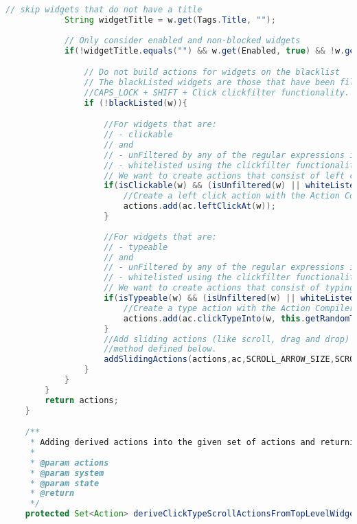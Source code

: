 \begin{lstlisting}[language=java, basicstyle=\tiny, caption=Protocol for the real world application, label=code:real-world-app-protocol]
            // skip widgets that do not have a title
			String widgetTitle = w.get(Tags.Title, "");
          
            // Only consider enabled and non-blocked widgets
            if(!widgetTitle.equals("") && w.get(Enabled, true) && !w.get(Blocked, false)){

                // Do not build actions for widgets on the blacklist
                // The blackListed widgets are those that have been filtered during the SPY mode with the
                //CAPS_LOCK + SHIFT + Click clickfilter functionality.
                if (!blackListed(w)){

                    //For widgets that are:
                    // - clickable
                    // and
                    // - unFiltered by any of the regular expressions in the Filter-tab, or
                    // - whitelisted using the clickfilter functionality in SPY mode (CAPS_LOCK + SHIFT + CNTR + Click)
                    // We want to create actions that consist of left clicking on them
                    if(isClickable(w) && (isUnfiltered(w) || whiteListed(w))) {
                        //Create a left click action with the Action Compiler, and add it to the set of derived actions
                        actions.add(ac.leftClickAt(w));
                    }
                   
                    //For widgets that are:
                    // - typeable
                    // and
                    // - unFiltered by any of the regular expressions in the Filter-tab, or
                    // - whitelisted using the clickfilter functionality in SPY mode (CAPS_LOCK + SHIFT + CNTR + Click)
                    // We want to create actions that consist of typing into them
                    if(isTypeable(w) && (isUnfiltered(w) || whiteListed(w))) {
                        //Create a type action with the Action Compiler, and add it to the set of derived actions
                        actions.add(ac.clickTypeInto(w, this.getRandomText(w), true));
                    }
                    //Add sliding actions (like scroll, drag and drop) to the derived actions
                    //method defined below.
                    addSlidingActions(actions,ac,SCROLL_ARROW_SIZE,SCROLL_THICK,w);
                }
            }
        }
        return actions;
    }

    /**
     * Adding derived actions into the given set of actions and returning the modified set of actions.
     *
     * @param actions
     * @param system
     * @param state
     * @return
     */
    protected Set<Action> deriveClickTypeScrollActionsFromTopLevelWidgets(Set<Action> actions, SUT system, State state){
        

\end{lstlisting}
